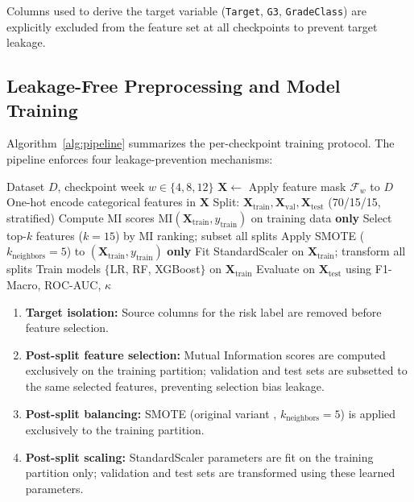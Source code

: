 \documentclass[conference,a4paper]{IEEEtran}
\begin{document}
Columns used to derive the target variable (\texttt{Target}, \texttt{G3}, \texttt{GradeClass}) are explicitly excluded from the feature set at all checkpoints to prevent target leakage.

\subsection{Leakage-Free Preprocessing and Model Training}\label{sec:training}

Algorithm~\ref{alg:pipeline} summarizes the per-checkpoint training protocol. The pipeline enforces four leakage-prevention mechanisms:

\begin{algorithm}[htbp]
\caption{Per-Checkpoint Training Protocol}
\label{alg:pipeline}
\begin{algorithmic}[1]
\REQUIRE Dataset $D$, checkpoint week $w \in \{4, 8, 12\}$
\STATE $\mathbf{X} \leftarrow$ Apply feature mask $\mathcal{F}_w$ to $D$
\STATE One-hot encode categorical features in $\mathbf{X}$
\STATE Split: $\mathbf{X}_{\text{train}}, \mathbf{X}_{\text{val}}, \mathbf{X}_{\text{test}}$ (70/15/15, stratified)
\STATE Compute MI scores $\text{MI}(\mathbf{X}_{\text{train}}, y_{\text{train}})$ on training data \textbf{only}
\STATE Select top-$k$ features ($k = 15$) by MI ranking; subset all splits
\STATE Apply SMOTE ($k_{\text{neighbors}}{=}5$) to $(\mathbf{X}_{\text{train}}, y_{\text{train}})$ \textbf{only}
\STATE Fit StandardScaler on $\mathbf{X}_{\text{train}}$; transform all splits
\STATE Train models $\{$LR, RF, XGBoost$\}$ on $\mathbf{X}_{\text{train}}$
\STATE Evaluate on $\mathbf{X}_{\text{test}}$ using F1-Macro, ROC-AUC, $\kappa$
\end{algorithmic}
\end{algorithm}

\begin{enumerate}[leftmargin=*, label=\arabic*)]
\item \textbf{Target isolation:} Source columns for the risk label are removed before feature selection.
\item \textbf{Post-split feature selection:} Mutual Information \cite{chandrashekar2014featureselection} scores are computed exclusively on the training partition; validation and test sets are subsetted to the same selected features, preventing selection bias leakage.
\item \textbf{Post-split balancing:} SMOTE (original variant \cite{chawla2002smote}, $k_{\text{neighbors}}{=}5$) is applied exclusively to the training partition.
\item \textbf{Post-split scaling:} StandardScaler parameters are fit on the training partition only; validation and test sets are transformed using these learned parameters.
\end{enumerate}
\end{document}
